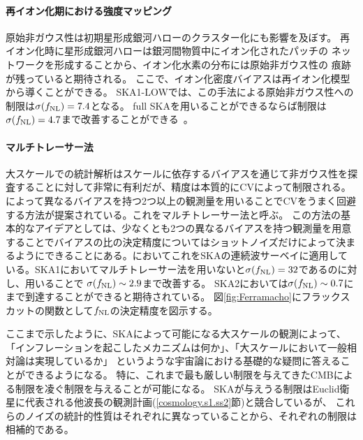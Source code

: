 \paragraph{再イオン化期における強度マッピング}

原始非ガウス性は初期星形成銀河ハローのクラスター化にも影響を及ぼす。
再イオン化時に星形成銀河ハローは銀河間物質中にイオン化されたパッチの
ネットワークを形成することから、イオン化水素の分布には原始非ガウス性の
痕跡が残っていると期待される。
ここで、イオン化密度バイアスは再イオン化模型から導くことができる。
SKA1-LOWでは、この手法による原始非ガウス性への制限は$\sigma (f_{\rm NL})=7.4$となる。
full SKAを用いることができるならば制限は$\sigma (f_{\rm NL})=4.7$まで改善することができる~\citep{Mao:2013yaa}。


\paragraph{マルチトレーサー法}

大スケールでの統計解析はスケールに依存するバイアスを通じて非ガウス性を探査することに対して非常に有利だが、精度は本質的にCVによって制限される。\cite{Seljak:2008xr}によって異なるバイアスを持つ2つ以上の観測量を用いることでCVをうまく回避する方法が提案されている。これをマルチトレーサー法と呼ぶ。
この方法の基本的なアイデアとしては、少なくとも2つの異なるバイアスを持つ観測量を用意することでバイアスの比の決定精度についてはショットノイズだけによって決まるようにできることにある。\cite{Ferramacho:2014pua}においてこれをSKAの連続波サーベイに適用している。SKA1においてマルチトレーサー法を用いないと$\sigma (f_{\rm NL})=32$であるのに対し、用いることで
$\sigma (f_{\rm NL})\sim 2.9$まで改善する。
SKA2においては$\sigma (f_{\rm NL})\sim 0.7$にまで到達することができると期待されている。
図\ref{fig:Ferramacho}にフラックスカットの関数として$f_{\rm NL}$の決定精度を図示する。

\bigskip

ここまで示したように、SKAによって可能になる大スケールの観測によって、
「インフレーションを起こしたメカニズムは何か」、「大スケールにおいて一般相対論は実現しているか」
というような宇宙論における基礎的な疑問に答えることができるようになる。
特に、これまで最も厳しい制限を与えてきたCMBによる制限を凌ぐ制限を与えることが可能になる。
SKAが与えうる制限はEuclid衛星に代表される他波長の観測計画(\ref{cosmology.s1.ss2}節)と競合しているが、
これらのノイズの統計的性質はそれぞれに異なっていることから、それぞれの制限は相補的である。



